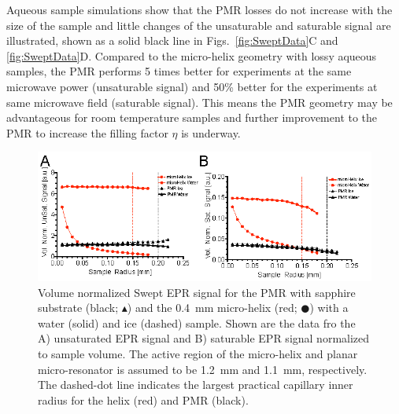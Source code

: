 Aqueous sample simulations show that the PMR losses do not increase with the size of the sample and little changes of the unsaturable and saturable signal are illustrated, shown as a solid black line in Figs.~\ref{fig:SweptData}C and \ref{fig:SweptData}D. Compared to the micro-helix geometry with lossy aqueous samples, the PMR performs 5 times better for experiments at the same microwave power (unsaturable signal) and 50\% better for the experiments at same microwave field (saturable signal). This means the PMR geometry may be advantageous for room temperature samples and further improvement to the PMR to increase the filling factor $\eta$ is underway. 

\begin{figure}[ht]
 \centering
 \includegraphics[width=\textwidth]{Kapitel/Ch2-Images/Ch2-AbsSweepOutput.eps}
 \caption[Volume normalized swept EPR signal optimization.]{Volume normalized Swept EPR signal for the PMR with sapphire substrate (black; $\blacktriangle$) and the 0.4~mm micro-helix (red; $\CIRCLE$) with a water (solid) and ice (dashed) sample. Shown are the data fro the A) unsaturated EPR signal and B) saturable EPR signal normalized to sample volume. The active region of the micro-helix and planar micro-resonator is assumed to be 1.2~mm and 1.1~mm, respectively. The dashed-dot line indicates the largest practical capillary inner radius for the helix (red) and PMR (black).}
 \label{fig:AbsSweptData}
\end{figure}

